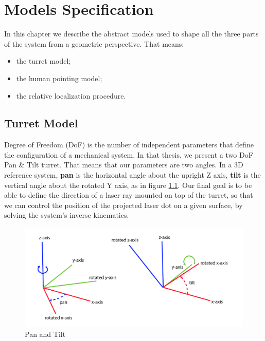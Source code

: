 \chapter{Models Specification}
\label{chap:1} 
In this chapter we describe the abstract models used to shape all the three parts of the system from a geometric perspective. That means:
\begin{itemize}
    \item the turret model;
    \item the human pointing model;
    \item the relative localization procedure.
\end{itemize}
\section{Turret Model}
\label{sec:1.1}
Degree of Freedom (DoF) is the number of independent parameters that define the configuration of a mechanical system. In that thesis, we present a two DoF Pan \& Tilt turret. That means that our parameters are two angles. In a 3D reference system, \textbf{pan} is the horizontal angle about the upright Z axis, \textbf{tilt} is the vertical angle about the rotated Y axis, as in figure \ref{fig:panTilt}.
Our final goal is to be able to define the direction of a laser ray mounted on top of the turret, so that we can control the position of the projected laser dot on a given surface, by solving the system's inverse kinematics.\\
\begin{figure}
	\centering
	\includegraphics[width=.7\textwidth]{img/panTilt.png}%
	\caption{Pan and Tilt}
	\label{fig:panTilt}
\end{figure}
